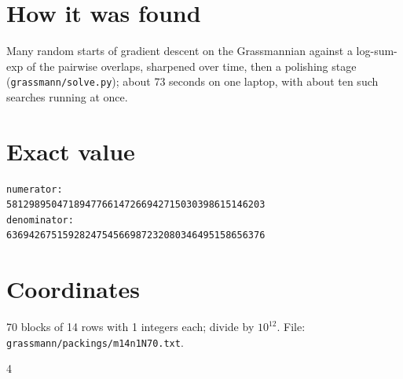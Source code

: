 \documentclass[11pt,a4paper]{article}
\begin{document}
\section{How it was found}
Many random starts of gradient descent on the Grassmannian against a log-sum-exp of the pairwise overlaps, sharpened over time, then a polishing stage (\texttt{grassmann/solve.py}); about 73 seconds on one laptop, with about ten such searches running at once.


\appendix
\section{Exact value}
{\small
\begin{verbatim}
numerator:
5812989504718947766147266942715030398615146203
denominator:
6369426751592824754566987232080346495158656376
\end{verbatim}}

\section{Coordinates}
70 blocks of 14 rows with 1 integers each; divide by $10^{12}$. File: \texttt{grassmann/packings/m14n1N70.txt}.
{\tiny
\begin{multicols}{4}
\end{multicols}}
\end{document}
